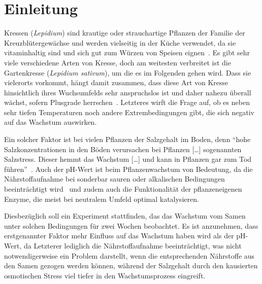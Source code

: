 \section{Einleitung} %
    \label{sec:einleitung}
    Kressen (\textit{Lepidium}) sind krautige oder strauchartige Pflanzen der Familie der Kreuzblütergewächse und werden vielseitig in der Küche verwendet, da sie vitaminhaltig sind und sich gut zum Würzen von Speisen eignen\ \cite[vgl.][]{web:meinschoenergarten}. Es gibt sehr viele verschiedene Arten von Kresse, doch am weitesten verbreitet ist die Gartenkresse (\textit{Lepidium sativum}), um die es im Folgenden gehen wird. Dass sie vielerorts vorkommt, hängt damit zusammen, dass diese Art von Kresse hinsichtlich ihres Wuchsumfelds sehr anspruchslos ist und daher nahezu überall wächst, sofern Plusgrade herrschen\ \cite[vgl.][]{web:meinschoenergarten}. \label{hypothese}Letzteres wirft die Frage auf, ob es neben sehr tiefen Temperaturen noch andere Extrembedingungen gibt, die sich negativ auf das Wachstum auswirken.\par
    Ein solcher Faktor ist bei vielen Pflanzen der Salzgehalt im Boden, denn ``hohe Salzkonzentrationen in den Böden verursachen bei Pflanzen [\dots] sogenannten Salzstress. Dieser hemmt das Wachstum [\dots] und kann in Pflanzen gar zum Tod führen''\ \cite{web:salzstress}. Auch der pH-Wert ist beim Pflanzenwachstum von Bedeutung, da die Nährstoffaufnahme bei sonderbar sauren oder alkalischen Bedingungen beeinträchtigt wird\ \cite[vgl.][]{web:phwert} und zudem auch die Funktionalität der pflanzeneigenen Enzyme, die meist bei neutralem Umfeld optimal katalysieren.\par
    Diesbezüglich soll ein Experiment stattfinden, das das Wachstum vom Samen unter solchen Bedingungen für zwei Wochen beobachtet. Es ist anzunehmen, dass erstgenannter Faktor mehr Einfluss auf das Wachstum haben wird als der pH-Wert, da Letzterer lediglich die Nährstoffaufnahme beeinträchtigt, was nicht notwendigerweise ein Problem darstellt, wenn die entsprechenden Nährstoffe aus den Samen gezogen werden können, während der Salzgehalt durch den kausierten osmotischen Stress viel tiefer in den Wachstumsprozess eingreift.
